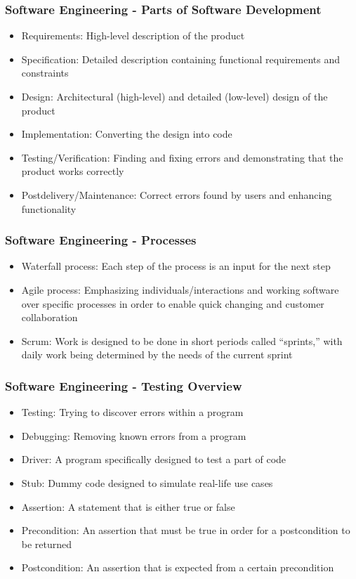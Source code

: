 \documentclass[c, aspectratio=169]{beamer}
\begin{document}
\begin{frame}\frametitle{Software Engineering - Parts of Software Development}
\begin{itemize}
\item Requirements: High-level description of the product
\item Specification: Detailed description containing functional requirements and constraints
\item Design: Architectural (high-level) and detailed (low-level) design of the product
\item Implementation: Converting the design into code
\item Testing/Verification: Finding and fixing errors and demonstrating that the product works correctly
\item Postdelivery/Maintenance: Correct errors found by users and enhancing functionality
\end{itemize}
\end{frame}

\begin{frame}\frametitle{Software Engineering - Processes}
\begin{itemize}
\item Waterfall process: Each step of the process is an input for the next step
\item Agile process: Emphasizing individuals/interactions and working software over specific processes in order to enable quick changing and customer collaboration
\item Scrum: Work is designed to be done in short periods called ``sprints,'' with daily work being determined by the needs of the current sprint
\end{itemize}
\end{frame}

\begin{frame}\frametitle{Software Engineering - Testing Overview}
\begin{itemize}
\item Testing: Trying to discover errors within a program
\item Debugging: Removing known errors from a program
\item Driver: A program specifically designed to test a part of code
\item Stub: Dummy code designed to simulate real-life use cases
\item Assertion: A statement that is either true or false
\item Precondition: An assertion that must be true in order for a postcondition to be returned
\item Postcondition: An assertion that is expected from a certain precondition
\end{itemize}
\end{frame}
\end{document}
